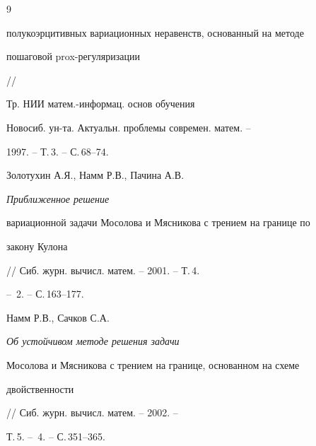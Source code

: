 \begin{thebibliography}{9}
{полукоэрцитивных вариационных неравенств, основанный на методе


пошаговой prox-регуляризации} // 


Тр. НИИ матем.-информац. основ обучения 


Новосиб. ун-та. Актуальн. проблемы современ. матем.  --


1997. -- Т.\,3. -- С.\,68--74.







Золотухин А.Я., Намм Р.В., Пачина А.В. {\em Приближенное решение


вариационной задачи Мосолова и Мясникова с трением на границе по


закону Кулона} // Сиб. журн. вычисл. матем. -- 2001. -- Т.\,4.


-- \No\,2. -- С.\,163--177.







Намм Р.В., Сачков С.А. {\em Об устойчивом методе решения задачи


Мосолова и Мясникова с трением на границе, основанном на схеме


двойственности} // Сиб. журн. вычисл. матем. -- 2002. --


Т.\,5. -- \No\,4. -- С.\,351--365.





\end{thebibliography}





\vskip 2cm












\label{end}





